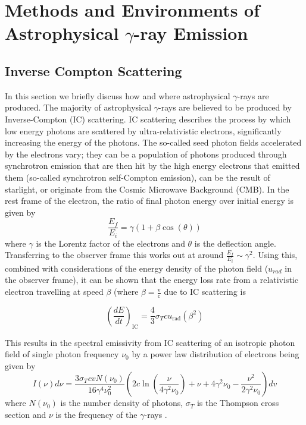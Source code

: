 \section{Methods and Environments of Astrophysical \ensuremath{\gamma}-ray Emission}
\subsection{Inverse Compton Scattering}

In this section we briefly discuss how and where astrophysical $\gamma$-rays are produced. The majority of astrophysical $\gamma$-rays are believed to be produced by Inverse-Compton (IC) scattering. IC scattering describes the process by which low energy photons are scattered by ultra-relativistic electrons, significantly increasing the energy of the photons. The so-called seed photon fields accelerated by the electrons vary; they can be a population of photons produced through synchrotron emission that are then hit by the high energy electrons that emitted them (so-called synchrotron self-Compton emission), can be the result of starlight, or originate from the Cosmic Microwave Background (CMB). In the rest frame of the electron, the ratio of final photon energy over initial energy is given by
\begin{equation}
    \frac{E_f}{E_i}=\gamma (1+\beta \cos(\theta))
\end{equation}
where $\gamma$ is the Lorentz factor of the electrons and $\theta$ is the deflection angle. Transferring to the observer frame this works out at around $\frac{E_f}{E_i}\sim \gamma^2$. Using this, combined with considerations of the energy density of the photon field ($u_{rad}$ in the observer frame), it can be shown \cite{longair} that the energy loss rate from a relativistic electron travelling at speed $\beta$ (where $\beta=\frac{\mathrm{v}}{\mathrm{c}}$ due to IC scattering is

\begin{equation}
    \left(\frac{dE}{dt}\right)_{\mathrm{IC}}=\frac{4}{3}\sigma_T c u_{\mathrm{rad}}\left(\beta^2\right)
\end{equation}

This results in the spectral emissivity from IC scattering of an isotropic photon field of single photon frequency $\nu_0$ by a power law distribution of electrons being given by 
\begin{equation}
    I(\nu)d\nu=\frac{3\sigma_TcvN(\nu_0)}{16\gamma^4\nu_0^2}\left(2c\ln\left(\frac{\nu}{4\gamma^2\nu_0}\right)+\nu+4\gamma^2\nu_0-\frac{\nu^2}{2\gamma^2\nu_0}\right)dv
\end{equation}
where $N(\nu_0)$ is the number density of photons, $\sigma_T$ is the Thompson cross section and $\nu$ is the frequency of the $\gamma$-rays \cite{blumenthal}.


